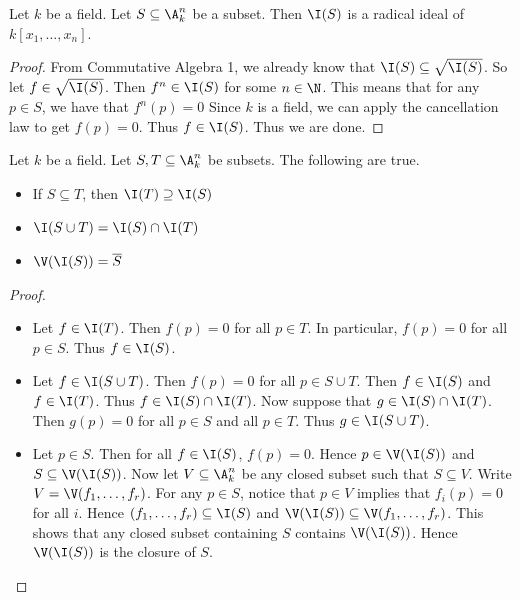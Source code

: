 \documentclass[a4paper]{article}
\begin{document}
\begin{prp}{}{} Let $k$ be a field. Let $S\subseteq\A_k^n$ be a subset. Then $\I(S)$ is a radical ideal of $k[x_1,\dots,x_n]$. 
\begin{proof}
From Commutative Algebra 1, we already know that $\I(S)\subseteq\sqrt{\I(S)}$. So let $f\in\sqrt{\I(S)}$. Then $f^n\in\I(S)$ for some $n\in\N$. This means that for any $p\in S$, we have that $f^n(p)=0$ Since $k$ is a field, we can apply the cancellation law to get $f(p)=0$. Thus $f\in\I(S)$. Thus we are done. 
\end{proof}
\end{prp}

\begin{prp}{}{} Let $k$ be a field. Let $S,T\subseteq\A_k^n$ be subsets. The following are true. 
\begin{itemize}
\item If $S\subseteq T$, then $\I(T)\supseteq\I(S)$
\item $\I(S\cup T)=\I(S)\cap\I(T)$
\item $\V(\I(S))=\overline{S}$
\end{itemize} 
\begin{proof}~\\
\begin{itemize}
\item Let $f\in\I(T)$. Then $f(p)=0$ for all $p\in T$. In particular, $f(p)=0$ for all $p\in S$. Thus $f\in\I(S)$. 
\item Let $f\in\I(S\cup T)$. Then $f(p)=0$ for all $p\in S\cup T$. Then $f\in\I(S)$ and $f\in\I(T)$. Thus $f\in\I(S)\cap\I(T)$. Now suppose that $g\in\I(S)\cap\I(T)$. Then $g(p)=0$ for all $p\in S$ and all $p\in T$. Thus $g\in\I(S\cup T)$. 
\item Let $p\in S$. Then for all $f\in\I(S)$, $f(p)=0$. Hence $p\in\V(\I(S))$ and $S\subseteq\V(\I(S))$. Now let $V\subseteq\A_k^n$ be any closed subset such that $S\subseteq V$. Write $V=\V(f_1,\dots,f_r)$. For any $p\in S$, notice that $p\in V$ implies that $f_i(p)=0$ for all $i$. Hence $(f_1,\dots,f_r)\subseteq\I(S)$ and $\V(\I(S))\subseteq\V(f_1,\dots,f_r)$. This shows that any closed subset containing $S$ contains $\V(\I(S))$. Hence $\V(\I(S))$ is the closure of $S$. 
\end{itemize}
\end{proof}
\end{prp}
\end{document}
